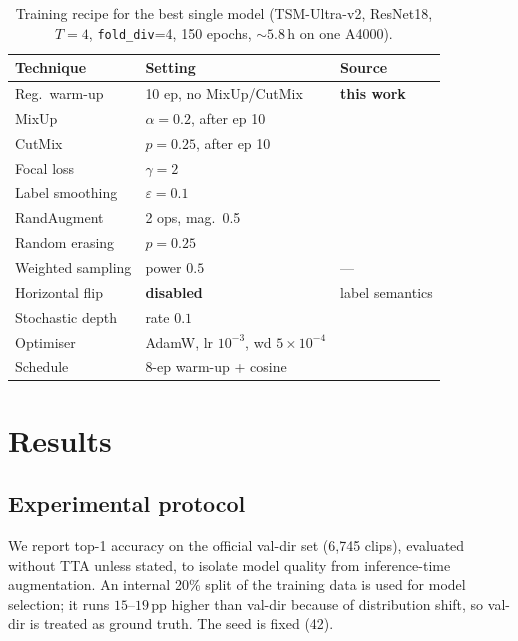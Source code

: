 \documentclass[10pt,twocolumn,letterpaper]{article}
\begin{document}
\begin{table}[t]
\centering\small
\setlength{\tabcolsep}{4pt}
\begin{tabular}{@{}lll@{}}
\toprule
Technique & Setting & Source \\
\midrule
Reg.\ warm-up      & 10 ep, no MixUp/CutMix & \textbf{this work} \\
MixUp              & $\alpha{=}0.2$, after ep 10 & \cite{zhang2018mixup} \\
CutMix             & $p{=}0.25$, after ep 10 & \cite{yun2019cutmix} \\
Focal loss         & $\gamma{=}2$ & \cite{lin2017focal} \\
Label smoothing    & $\varepsilon{=}0.1$ & \cite{muller2019labelsmooth} \\
RandAugment        & 2 ops, mag.\ 0.5 & \cite{cubuk2020randaugment} \\
Random erasing     & $p{=}0.25$ & \cite{zhong2020randomerase} \\
Weighted sampling  & power $0.5$ & --- \\
Horizontal flip    & \textbf{disabled} & label semantics \\
Stochastic depth   & rate $0.1$ & \cite{huang2016stochdepth} \\
Optimiser          & AdamW, lr $10^{-3}$, wd $5{\times}10^{-4}$ & \cite{loshchilov2019adamw} \\
Schedule           & 8-ep warm-up + cosine & \cite{loshchilov2017sgdr} \\
\bottomrule
\end{tabular}
\caption{Training recipe for the best single model (TSM-Ultra-v2, ResNet18,
$T{=}4$, \texttt{fold\_div}=4, 150 epochs, ${\sim}5.8$\,h on one A4000).}
\label{tab:recipe}
\end{table}

\section{Results}
\label{sec:results}

\subsection{Experimental protocol}
We report top-1 accuracy on the official val-dir set (6{,}745 clips), evaluated
without TTA unless stated, to isolate model quality from inference-time
augmentation. An internal 20\% split of the training data is used for model
selection; it runs $15$--$19$\,pp higher than val-dir because of distribution
shift, so val-dir is treated as ground truth. The seed is fixed (42).
\end{document}
